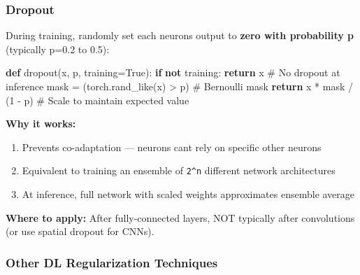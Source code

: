 \documentclass[11pt]{article}
\providecommand{\tightlist}{\setlength{\itemsep}{1pt}\setlength{\parskip}{0pt}}
\newenvironment{Shaded}{\begin{snugshade}}{\end{snugshade}}
\newcommand{\CommentTok}[1]{\textcolor[rgb]{0.48,0.49,0.49}{#1}}
\newcommand{\ControlFlowTok}[1]{\textcolor[rgb]{0.99,0.74,0.29}{\textbf{#1}}}
\newcommand{\DecValTok}[1]{\textcolor[rgb]{0.96,0.45,0.00}{#1}}
\newcommand{\KeywordTok}[1]{\textcolor[rgb]{0.81,0.81,0.76}{\textbf{#1}}}
\newcommand{\NormalTok}[1]{\textcolor[rgb]{0.81,0.81,0.76}{#1}}
\newcommand{\OperatorTok}[1]{\textcolor[rgb]{0.81,0.81,0.76}{#1}}
\newcommand{\VariableTok}[1]{\textcolor[rgb]{0.15,0.68,0.68}{#1}}
\begin{document}
\subsubsection{Dropout}\label{dropout}

During training, randomly set each neuron\textquotesingle s output to \textbf{zero with probability p} (typically p=0.2 to 0.5):


\begin{Shaded}
\begin{Highlighting}[]
\KeywordTok{def}\NormalTok{ dropout(x, p, training}\OperatorTok{=}\VariableTok{True}\NormalTok{):}
    \ControlFlowTok{if} \KeywordTok{not}\NormalTok{ training:}
        \ControlFlowTok{return}\NormalTok{ x                          }\CommentTok{\# No dropout at inference}
\NormalTok{    mask }\OperatorTok{=}\NormalTok{ (torch.rand\_like(x) }\OperatorTok{\textgreater{}}\NormalTok{ p)      }\CommentTok{\# Bernoulli mask}
    \ControlFlowTok{return}\NormalTok{ x }\OperatorTok{*}\NormalTok{ mask }\OperatorTok{/}\NormalTok{ (}\DecValTok{1} \OperatorTok{{-}}\NormalTok{ p)            }\CommentTok{\# Scale to maintain expected value}
\end{Highlighting}
\end{Shaded}

\textbf{Why it works:}

\begin{enumerate}
\def\labelenumi{\arabic{enumi}.}
\tightlist
\item
  Prevents co-adaptation --- neurons can\textquotesingle t rely on specific other neurons
\item
  Equivalent to training an ensemble of \texttt{2\^{}n} different network architectures
\item
  At inference, full network with scaled weights approximates ensemble average
\end{enumerate}

\textbf{Where to apply:} After fully-connected layers, NOT typically after convolutions (or use spatial dropout for CNNs).

\subsubsection{Other DL Regularization Techniques}\label{other-dl-regularization-techniques}
\end{document}
